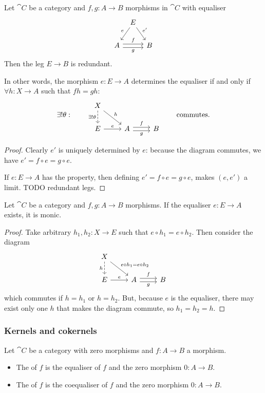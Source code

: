 \begin{lemma}
Let $\cat{C}$ be a category and $f,g: A\to B$ morphisms in $\cat{C}$ with equaliser
\[ \begin{tikzcd}[column sep=tiny]
& E \ar[dl, swap, "e"] \ar[dr, "{e'}"] & \\
A \ar[rr, shift left, "f"] \ar[rr, shift right, swap, "g"] && B
\end{tikzcd} \]
Then the leg $E\to B$ is redundant.
\end{lemma}
In other words, the morphism $e: E\to A$ determines the equaliser \textup{if and only if} $\forall h: X\to A$ such that $fh = gh$:
\[ \exists! \theta : \qquad \begin{tikzcd}
X \ar[d, dashed, swap, "{\exists! \theta}"] \ar[dr, "h"] && \\
E \ar[r, "e"] & A \ar[r, shift left, "f"] \ar[r, shift right, swap, "g"] & B
\end{tikzcd} \qquad \text{commutes.} \]
\begin{proof}
Clearly $e'$ is uniquely determined by $e$: because the diagram commutes, we have $e' = f\circ e = g\circ e$.

If $e: E\to A$ has the property, then defining $e' = f\circ e = g\circ e$, makes $(e,e')$ a limit. TODO redundant legs.
\end{proof}

\begin{lemma} \label{equaliserMonic}
Let $\cat{C}$ be a category and $f,g: A\to B$ morphisms. If the equaliser $e: E\to A$ exists, it is monic.
\end{lemma}
\begin{proof}
Take arbitrary $h_1, h_2: X\to E$ such that $e\circ h_1 = e\circ h_2$. Then consider the diagram
\[ \begin{tikzcd}
X \ar[d, dashed, swap, "h"] \ar[dr, "{e\circ h_1 = e\circ h_2}"] && \\
E \ar[r, "e"] & A \ar[r, shift left, "f"] \ar[r, shift right, swap, "g"] & B
\end{tikzcd} \]
which commutes if $h = h_1$ or $h = h_2$. But, because $e$ is the equaliser, there may exist only one $h$ that makes the diagram commute, so $h_1 = h_2 = h$.
\end{proof}

\subsubsection{Kernels and cokernels}
\begin{definition}
Let $\cat{C}$ be a category with zero morphisms and $f:A\to B$ a morphism.
\begin{itemize}
\item The  of $f$ is the equaliser of $f$ and the zero morphism $0:A\to B$.
\item The  of $f$ is the coequaliser of $f$ and the zero morphism $0:A\to B$.
\end{itemize}
\end{definition}

